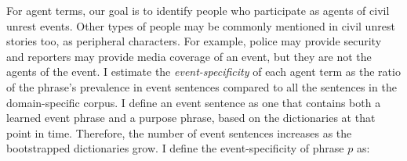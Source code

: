 

For agent terms, our goal is 
to identify people who participate as agents of civil unrest events.
Other types of people may be commonly mentioned in civil unrest
stories too, as peripheral characters.
For example, police may provide security and reporters may provide
media coverage of an event, but they are not the agents of the
event. 
I estimate the {\it event-specificity} of each agent term as the
ratio of the phrase's prevalence in  event sentences compared to 
all the sentences in the domain-specific corpus.
I define an event sentence as one that
contains both a learned event phrase and a purpose phrase, based on
the dictionaries at that point in time. Therefore, the number of event
sentences increases as the bootstrapped dictionaries grow.
I define the event-specificity of phrase $p$ as:



